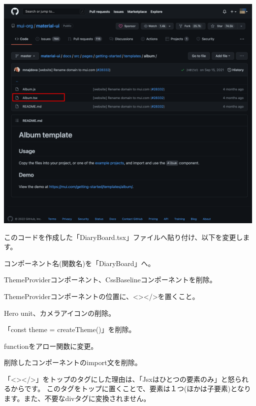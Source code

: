 \begin{reviewimage}[H]%
\includegraphics[width=0.6\maxwidth]{./images/03-todo-with-react/mui007-albumLayoutSourceCode.png}%
\label{image:03-todo-with-react:mui007-albumLayoutSourceCode}
\end{reviewimage}

\clearpage


このコードを作成した「DiaryBoard.tsx」ファイルへ貼り付け、以下を変更します。

\begin{starteritemize}
\item コンポーネント名(関数名)を「DiaryBoard」へ。
\item ThemeProviderコンポーネント、CssBaselineコンポーネントを削除。
\item ThemeProviderコンポーネントの位置に、\textless{}\textgreater{}\textless{}/\textgreater{}を置くこと。
\item Hero unit、カメラアイコンの削除。
\item 「const theme = createTheme()」を削除。
\item functionをアロー関数に変更。
\item 削除したコンポーネントのimport文を削除。
\end{starteritemize}

「\textless{}\textgreater{}\textless{}/\textgreater{}」をトップのタグにした理由は、「Jsxはひとつの要素のみ」と怒られるからです。
このタグをトップに置くことで、要素は１つ(ほかは子要素)となります。また、不要なdivタグに変換されません。

